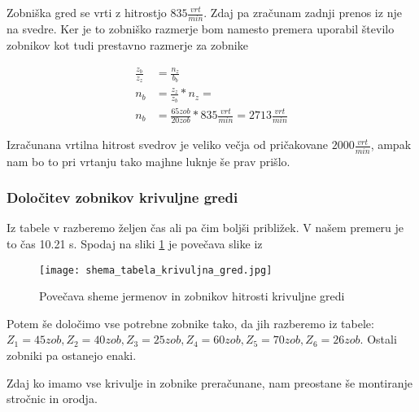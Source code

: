 Zobniška gred se vrti z hitrostjo \(835 \frac{vrt}{min}\). Zdaj pa zračunam
zadnji prenos iz nje na svedre. Ker je to zobniško razmerje bom namesto
premera uporabil število zobnikov kot tudi prestavno razmerje za zobnike

\begin{equation}
	\label{eq:12}
	\begin{split}
		\frac{z_b}{z_z} &= \frac{n_z}{b_b} \\
		n_b &= \frac{z_z}{z_b} * n_z = \\
		n_b &= \frac{65 zob}{20 zob} * 835 \frac{vrt}{min} = 2713 \frac{vrt}{min}
	\end{split}
\end{equation}

Izračunana vrtilna hitrost svedrov je veliko večja od pričakovane \(2000\frac{vrt}{min}\),
ampak nam bo to pri vrtanju tako majhne luknje še prav prišlo.

\subsubsection{Določitev zobnikov krivuljne gredi}

Iz tabele v  razberemo željen čas
ali pa čim boljši približek. V našem premeru je to čas 10.21 s.
Spodaj na sliki \ref{povecava} je povečava slike iz 
\begin{figure}[H]
	\begin{center}
		\texttt{[image: shema\_tabela\_krivuljna\_gred.jpg]}
		\caption{Povečava sheme jermenov in zobnikov
			hitrosti krivuljne gredi
			\cite{gauthier}}
		\label{povecava}
	\end{center}
\end{figure}

Potem še določimo vse potrebne zobnike tako, da jih razberemo iz tabele: \\
\(Z_1 = 45 zob, Z_2 = 40 zob, Z_3 = 25 zob, Z_4 = 60 zob, Z_5 = 70 zob, Z_6 = 26 zob\).
Ostali zobniki pa ostanejo enaki.

Zdaj ko imamo vse krivulje in zobnike preračunane, nam preostane še montiranje stročnic in orodja.